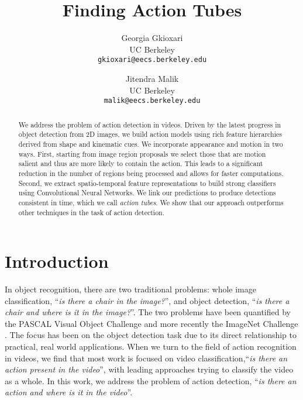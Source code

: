 \documentclass[10pt,twocolumn,letterpaper]{article}
\begin{document}
\title{Finding Action Tubes}

\author{Georgia Gkioxari\\
UC Berkeley\\
{\tt\small gkioxari@eecs.berkeley.edu}
\and
Jitendra Malik\\
UC Berkeley\\
{\tt\small malik@eecs.berkeley.edu}
}

\maketitle


\begin{abstract}
 We address the problem of action detection in videos. Driven by the latest progress in object detection from 2D images, we build action models using rich feature hierarchies derived from shape and kinematic cues. We incorporate appearance and motion in two ways. First, starting from image region proposals we select those that are motion salient and thus are more likely to contain the action. This leads to a significant reduction in the number of regions being processed and allows for faster computations. Second, we extract spatio-temporal feature representations to build strong classifiers using Convolutional Neural Networks. We link our predictions to produce detections consistent in time, which we call \textit{action tubes}. We show that our approach outperforms other techniques in the task of action detection.
\end{abstract}
\section{Introduction}

In object recognition, there are two traditional problems: whole image classification, ``\textit{is there a chair in the image?}'', and object detection, ``\textit{is there a chair and where is it in the image?}''. The two problems have been quantified by the PASCAL Visual Object Challenge \cite{PASCAL-ijcv,PASCAL11} and more recently the ImageNet Challenge \cite{imagenet_cvpr09,ILSVRC12}. The focus has been on the object detection task due to its direct relationship to practical, real world applications. When we turn to the field of action recognition in videos, we find that most work is focused on video classification,``\textit{is there an action present in the video}'', with leading approaches \cite{wang2011,wang2013,simonyan2014} trying to classify the video as a whole. In this work,  we address the problem of action detection, ``\textit{is there an action and where is it in the video}''. 
\end{document}

